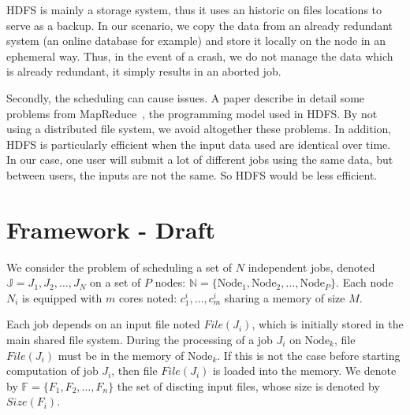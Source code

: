 \documentclass[conference,10pt]{IEEEtran}
\newcommand{\Node}[1]{\ensuremath{\mathrm{Node}_{#1}}\xspace}
\newcommand{\file}{\ensuremath{\mathit{File}}\xspace}
\newcommand{\size}{\ensuremath{\mathit{Size}}\xspace}
\newcommand{\fileset}{\ensuremath{\mathbb{F}}\xspace}
\newcommand{\jobset}{\ensuremath{\mathbb{J}}\xspace}
\newcommand{\nodeset}{\ensuremath{\mathbb{N}}\xspace}
\begin{document}
HDFS is mainly a storage system, thus it uses an historic on files locations to serve as a backup. 
In our scenario, we copy the data from an already redundant system (an online database for example) and store it locally on the node in an ephemeral way. Thus, in the event of a crash, we do not manage the data which is already redundant, it simply results in an aborted job.

Secondly, the scheduling can cause issues. A paper describe in detail some problems from
MapReduce~\cite{issue_with_hdfs}, the programming model used in HDFS.
By not using a distributed file system, we avoid altogether these problems. 
In addition, HDFS is particularly efficient when the input data used are identical over time.
In our case, one user will submit a lot of different jobs using the same data, but between users,
the inputs are not the same. So HDFS would be less efficient.

\section{Framework - Draft}\label{sec.framework}

We consider the problem of scheduling a set of $N$ independent jobs,
denoted $\jobset = {J_1, J_2, \ldots, J_N}$ on a set of $P$ nodes:
$\nodeset = \{\Node{1}, \Node{2}, \ldots, \Node{P}\}$.
Each node $N_i$ is equipped with $m$ cores noted:
$c^i_1,\ldots,c^i_m$ sharing a memory of size $M$.

Each job depends on an input file noted $\file(J_i)$, which is
initially stored in the main shared file system.  During the
processing of a job $J_i$ on $\Node{k}$, file $\file(J_i)$ must be in
the memory of $\Node{k}$. If this is not the case before starting
computation of job $J_i$, then file $\file(J_i)$ is loaded into the
memory.  We denote by $\fileset = \{F_1, F_2, \ldots, F_n\}$ the set
of discting input files, whose size is denoted by $\size(F_i)$.
\end{document}
